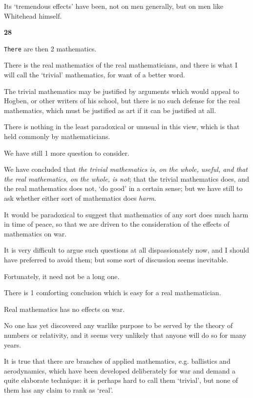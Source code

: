 \documentclass{article}
\numberwithin{equation}{section}
\begin{document}
Its `tremendous effects' have been, not on men generally, but on men like Whitehead himself.

\begin{center}
    \large\textbf{28}
\end{center}
\texttt{There} are then 2 mathematics.

There is the real mathematics of the real mathematicians, and there is what I will call the `trivial' mathematics, for want of a better word.

The trivial mathematics may be justified by arguments which would appeal to Hogben, or other writers of his school, but there is no such defense for the real mathematics, which must be justified as art if it can be justified at all.

There is nothing in the least paradoxical or unusual in this view, which is that held commonly by mathematicians.

%
We have still 1 more question to consider.

We have concluded that \textit{the trivial mathematics is, on the whole, useful, and that the real mathematics, on the whole, is not}; that the trivial mathematics does, and the real mathematics does not, `do good' in a certain sense; but we have still to ask whether either sort of mathematics does \textit{harm}.

It would be paradoxical to suggest that mathematics of any sort does much harm in time of peace, so that we are driven to the consideration of the effects of mathematics on war.

It is very difficult to argue such questions at all dispassionately now, and I should have preferred to avoid them; but some sort of discussion seems inevitable.

Fortunately, it need not be a long one.

%
There is 1 comforting conclusion which is easy for a real mathematician.

Real mathematics has no effects on war.

No one has yet discovered any warlike purpose to be served by the theory of numbers or relativity, and it seems very unlikely that anyone will do so for many years.

It is true that there are branches of applied mathematics, e.g. ballistics and aerodynamics, which have been developed deliberately for war and demand a quite elaborate technique: it is perhaps hard to call them `trivial', but none of them has any claim to rank as `real'.
\end{document}
